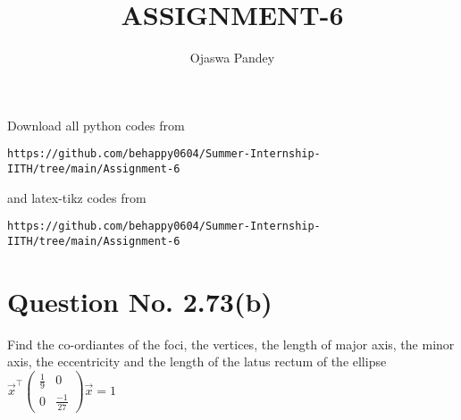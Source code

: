 \documentclass[journal,12pt,twocolumn]{IEEEtran}
\newcommand{\myvec}[1]{\ensuremath{\begin{pmatrix}#1\end{pmatrix}}}
\begin{document}
     \def\topbox#1{\raisebox{-\baselineskip}[0in][0in]{#1}}
     \def\midbox#1{\raisebox{-0.5\baselineskip}[0in][0in]{#1}}
\vspace{3cm}
\title{ASSIGNMENT-6}
\author{Ojaswa Pandey}
\maketitle
\newpage
\bigskip
\renewcommand{\thefigure}{\theenumi}
\renewcommand{\thetable}{\theenumi}
Download all python codes from 
\begin{lstlisting}
https://github.com/behappy0604/Summer-Internship-IITH/tree/main/Assignment-6
\end{lstlisting}
%
and latex-tikz codes from 
%
\begin{lstlisting}
https://github.com/behappy0604/Summer-Internship-IITH/tree/main/Assignment-6
\end{lstlisting}
%
\section{Question No. 2.73(b)} 
Find the co-ordiantes of the foci, the vertices, the length of major axis, the minor axis, the eccentricity and the length of the latus rectum of the ellipse
$\vec{x}^{\top}\myvec{\frac{1}{9} & 0 \\ 0 &\frac{-1}{27} }\vec{x}=1 $
\end{document}
